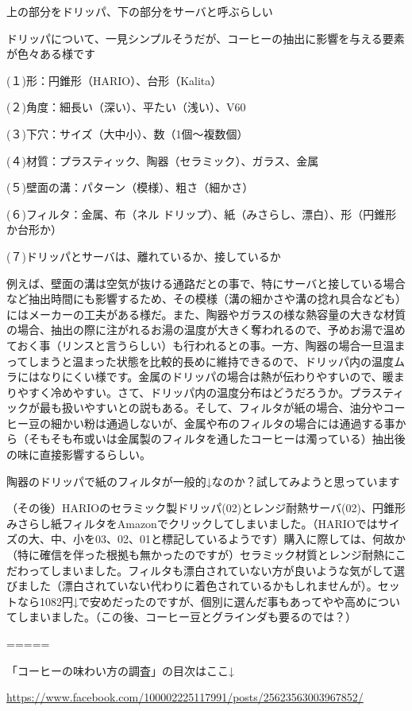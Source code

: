 \documentclass[facebook_diary.tex]{subfiles}
\begin{document}
上の部分をドリッパ、下の部分をサーバと呼ぶらしい

ドリッパについて、一見シンプルそうだが、コーヒーの抽出に影響を与える要素が色々ある様です


(１)形：円錐形（HARIO）、台形（Kalita）

(２)角度：細長い（深い）、平たい（浅い）、V60

(３)下穴：サイズ（大中小）、数（1個〜複数個）

(４)材質：プラスティック、陶器（セラミック）、ガラス、金属

(５)壁面の溝：パターン（模様）、粗さ（細かさ）

(６)フィルタ：金属、布（ネル ドリップ）、紙（みさらし、漂白）、形（円錐形か台形か）

(７)ドリッパとサーバは、離れているか、接しているか


例えば、壁面の溝は空気が抜ける通路だとの事で、特にサーバと接している場合など抽出時間にも影響するため、その模様（溝の細かさや溝の捻れ具合なども）にはメーカーの工夫がある様だ。また、陶器やガラスの様な熱容量の大きな材質の場合、抽出の際に注がれるお湯の温度が大きく奪われるので、予めお湯で温めておく事（リンスと言うらしい）も行われるとの事。一方、陶器の場合一旦温まってしまうと温まった状態を比較的長めに維持できるので、ドリッパ内の温度ムラにはなりにくい様です。金属のドリッパの場合は熱が伝わりやすいので、暖まりやすく冷めやすい。さて、ドリッパ内の温度分布はどうだろうか。プラスティックが最も扱いやすいとの説もある。そして、フィルタが紙の場合、油分やコーヒー豆の細かい粉は通過しないが、金属や布のフィルタの場合には通過する事から（そもそも布或いは金属製のフィルタを通したコーヒーは濁っている）抽出後の味に直接影響するらしい。


陶器のドリッパで紙のフィルタが一般的↓なのか？試してみようと思っています


（その後）HARIOのセラミック製ドリッパ(02)とレンジ耐熱サーバ(02)、円錐形みさらし紙フィルタをAmazonでクリックしてしまいました。（HARIOではサイズの大、中、小を03、02、01と標記しているようです）購入に際しては、何故か（特に確信を伴った根拠も無かったのですが）セラミック材質とレンジ耐熱にこだわってしまいました。フィルタも漂白されていない方が良いような気がして選びました（漂白されていない代わりに着色されているかもしれませんが）。セットなら1082円↓で安めだったのですが、個別に選んだ事もあってやや高めについてしまいました。（この後、コーヒー豆とグラインダも要るのでは？）


=====

「コーヒーの味わい方の調査」の目次はここ↓

\url{https://www.facebook.com/100002225117991/posts/25623563003967852/}
\end{document}
